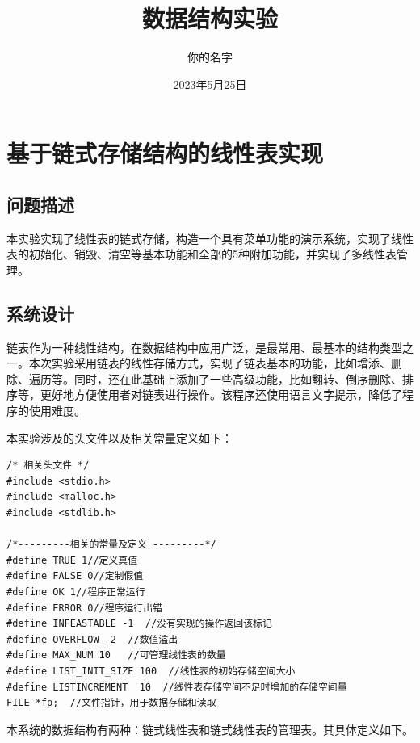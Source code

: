 \documentclass[supercite]{Experimental_Report}
\title{~~~~~~数据结构实验~~~~~~}
\author{你的名字}
\date{2023年5月25日}
\theoremstyle{definition}
\begin{document}
\maketitle


\clearpage


\tableofcontents[level=2]

\clearpage


\section{基于链式存储结构的线性表实现}


\subsection{问题描述}

本实验实现了线性表的链式存储，构造一个具有菜单功能的演示系统，实现了线性表的初始化、销毁、清空等基本功能和全部的5种附加功能，并实现了多线性表管理。

\subsection{系统设计}

链表作为一种线性结构，在数据结构中应用广泛，是最常用、最基本的结构类型之一。本次实验采用链表的线性存储方式，实现了链表基本的功能，比如增添、删除、遍历等。同时，还在此基础上添加了一些高级功能，比如翻转、倒序删除、排序等，更好地方便使用者对链表进行操作。该程序还使用语言文字提示，降低了程序的使用难度。

本实验涉及的头文件以及相关常量定义如下：

\begin{lstlisting}[title = 相关常量定义,frame=none]
/* 相关头文件 */
#include <stdio.h>
#include <malloc.h>
#include <stdlib.h>

/*---------相关的常量及定义 ---------*/
#define TRUE 1//定义真值 
#define FALSE 0//定制假值 
#define OK 1//程序正常运行 
#define ERROR 0//程序运行出错 
#define INFEASTABLE -1  //没有实现的操作返回该标记
#define OVERFLOW -2  //数值溢出 
#define MAX_NUM 10   //可管理线性表的数量
#define LIST_INIT_SIZE 100  //线性表的初始存储空间大小
#define LISTINCREMENT  10  //线性表存储空间不足时增加的存储空间量
FILE *fp;  //文件指针，用于数据存储和读取
\end{lstlisting}

本系统的数据结构有两种：链式线性表和链式线性表的管理表。其具体定义如下。
\end{document}

